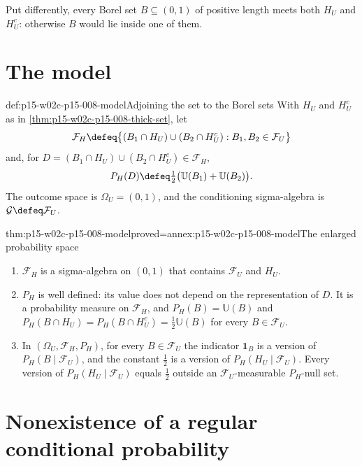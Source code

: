 Put differently, every Borel set \(B\subseteq(0,1)\) of positive length
meets both \(H_U\) and \(H_U^c\): otherwise \(B\) would lie inside one of
them.

\section{The model}
\label{sec:p15-w02c-p15-008-model}

\begin{hbdefinition}{def:p15-w02c-p15-008-model}{Adjoining the set to the Borel sets}
With \(H_U\) and \(H_U^c\) as in \cref{thm:p15-w02c-p15-008-thick-set},
let
\[
 \mathcal F_H\defeq\bigl\{(B_1\cap H_U)\cup(B_2\cap H_U^c):
                    B_1,B_2\in\mathcal F_U\bigr\}
\]
and, for \(D=(B_1\cap H_U)\cup(B_2\cap H_U^c)\in\mathcal F_H\),
\[
 P_H(D)\defeq\tfrac12\bigl(\mathbb U(B_1)+\mathbb U(B_2)\bigr).
\]
The outcome space is \(\Omega_U=(0,1)\), and the conditioning
sigma-algebra is \(\mathcal G\defeq\mathcal F_U\).
\end{hbdefinition}

\begin{hbtheorem}{thm:p15-w02c-p15-008-model}{proved=annex:p15-w02c-p15-008-model}{The enlarged probability space}
\begin{enumerate}
\item \(\mathcal F_H\) is a sigma-algebra on \((0,1)\) that contains
      \(\mathcal F_U\) and \(H_U\).
\item \(P_H\) is well defined: its value does not depend on the
      representation of \(D\). It is a probability measure on
      \(\mathcal F_H\), and \(P_H(B)=\mathbb U(B)\) and
      \(P_H(B\cap H_U)=P_H(B\cap H_U^c)=\tfrac12\mathbb U(B)\) for every
      \(B\in\mathcal F_U\).
\item In \((\Omega_U,\mathcal F_H,P_H)\), for every \(B\in\mathcal F_U\)
      the indicator \(\mathbf1_B\) is a version of
      \(P_H(B\mid\mathcal F_U)\), and the constant \(\tfrac12\) is a
      version of \(P_H(H_U\mid\mathcal F_U)\). Every version of
      \(P_H(H_U\mid\mathcal F_U)\) equals \(\tfrac12\) outside an
      \(\mathcal F_U\)-measurable \(P_H\)-null set.
\end{enumerate}
\end{hbtheorem}

\section{Nonexistence of a regular conditional probability}
\label{sec:p15-w02c-p15-008-nonexistence}

